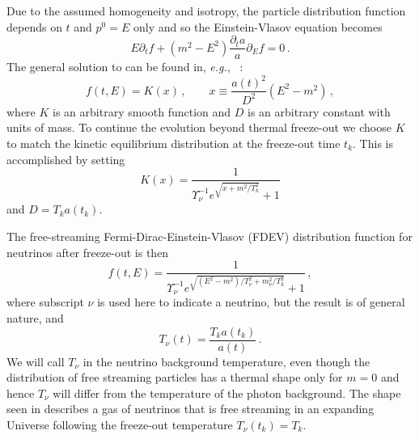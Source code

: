Due to the assumed homogeneity and isotropy, the particle distribution function depends on $t$ and $p^0=E$ only and so the Einstein-Vlasov equation becomes
\begin{equation}\label{VEeqFLR}
E\partial_tf+(m^2-E^2)\frac{\partial_ta}{a}\partial_{E}f=0\,.
\end{equation}
The general solution to  can be found in, {\it e.g.\/}, ~\cite{Choquet-Bruhat:2009xil,Wong:2011ip}:
\begin{equation}
f(t,E)=K(x)\,,\qquad
x\equiv\frac{a(t)^2}{D^2}(E^2-m^2)\,,
\end{equation}
where $K$ is an arbitrary smooth function and $D$ is an arbitrary constant with units of mass. To continue the evolution beyond thermal freeze-out we choose $K$ to match the kinetic equilibrium distribution  at the freeze-out time $t_k$. This is accomplished by setting
\begin{equation}
K(x)=\frac{1}{\Upsilon_\nu^{-1}e^{\sqrt{x+m^2/T_k^2}}+ 1}
\end{equation}
and $D=T_k a(t_k)$. 

The free-streaming Fermi-Dirac-Einstein-Vlasov (FDEV) distribution function for neutrinos after freeze-out is then
\begin{equation}\label{eq:NeutrinoDist}
f(t,E)=\frac{1}{\Upsilon_\nu^{-1}e^{\sqrt{(E^2-m^2)/T_\nu^2+m_\nu^2 /T_k^2}}+ 1}\,,
\end{equation}
where subscript $\nu$ is used here to indicate a neutrino, but the result is of general nature, and 
\begin{equation}\label{eq:TneutrinoDist}
T_\nu(t)=\frac{T_ka(t_k)}{a(t)}\,. 
\end{equation}
We will call $T_\nu$ in  the neutrino background temperature, even though the distribution of free streaming particles has a thermal shape only for $m=0$ and hence $T_{\nu}$ will differ from the temperature of the photon background. The shape seen in   describes a gas of neutrinos that is free streaming in an expanding Universe following the freeze-out temperature $T_\nu(t_k)=T_k$. 

